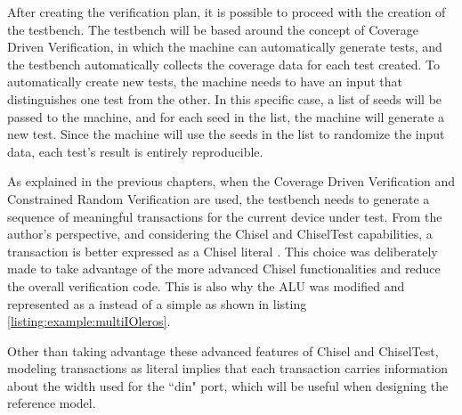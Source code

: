 After creating the verification plan, it is possible to proceed with the
creation of the testbench. The testbench will be based around the concept of
Coverage Driven Verification, in which the machine can automatically generate
tests, and the testbench automatically collects the coverage data for each test
created. To automatically create new tests, the machine needs to have an input
that distinguishes one test from the other. In this specific case, a list of
seeds will be passed to the machine, and for each seed in the list, the machine
will generate a new test. Since the machine will use the seeds in the list to
randomize the input data, each test's result is entirely reproducible.

As explained in the previous chapters, when the Coverage Driven Verification and
Constrained Random Verification are used, the testbench needs to generate a
sequence of meaningful transactions for the current device under test. From the
author's perspective, and considering the Chisel and ChiselTest capabilities, a
transaction is better expressed as a Chisel literal . This choice
was deliberately made to take advantage of the more advanced Chisel
functionalities and reduce the overall verification code. This is also why the
ALU was modified and represented as a  instead of a simple
 as shown in listing \ref{listing:example:multiIOleros}.


Other than taking advantage these advanced features of Chisel and ChiselTest,
modeling transactions as literal  implies that each transaction
carries information about the width used for the ``din" port, which will be
useful when designing the reference model.

